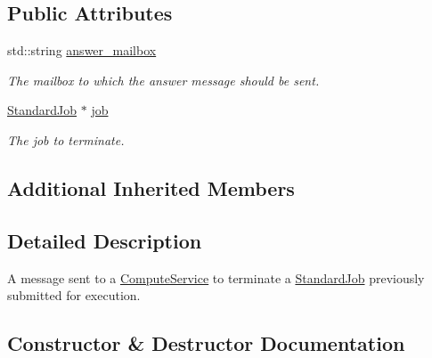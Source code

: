\subsection*{Public Attributes}
\begin{DoxyCompactItemize}
\item 
\mbox{\label{classwrench_1_1_compute_service_terminate_standard_job_request_message_a02029e980925195d42060664bc9fbd7c}} 
std\+::string \hyperlink{classwrench_1_1_compute_service_terminate_standard_job_request_message_a02029e980925195d42060664bc9fbd7c}{answer\+\_\+mailbox}
\begin{DoxyCompactList}\small\item\em The mailbox to which the answer message should be sent. \end{DoxyCompactList}\item 
\mbox{\label{classwrench_1_1_compute_service_terminate_standard_job_request_message_af04d6133dd07c6c1424ea159d7f62de3}} 
\hyperlink{classwrench_1_1_standard_job}{Standard\+Job} $\ast$ \hyperlink{classwrench_1_1_compute_service_terminate_standard_job_request_message_af04d6133dd07c6c1424ea159d7f62de3}{job}
\begin{DoxyCompactList}\small\item\em The job to terminate. \end{DoxyCompactList}\end{DoxyCompactItemize}
\subsection*{Additional Inherited Members}


\subsection{Detailed Description}
A message sent to a \hyperlink{classwrench_1_1_compute_service}{Compute\+Service} to terminate a \hyperlink{classwrench_1_1_standard_job}{Standard\+Job} previously submitted for execution. 

\subsection{Constructor \& Destructor Documentation}
\mbox{\label{classwrench_1_1_compute_service_terminate_standard_job_request_message_a8b9be8c807df77a00d1cb899551b5256}} 
